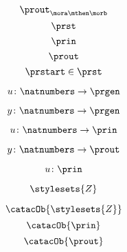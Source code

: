 {\begin{forslides}
        \begin{equation}
            \label{eq:morab-prout}
            \prout_{\mora\mthen\morb}
        \end{equation}
        \begin{equation}
            \label{eq:gen-prst}
            \prst
        \end{equation}
        \begin{equation}
            \label{eq:gen-prin}
            \prin
        \end{equation}
        \begin{equation}
            \label{eq:gen-prout}
            \prout
        \end{equation}
        \begin{equation}
            \label{eq:moore-start}
            \prstart \in \prst
        \end{equation}
        
        \begin{equation}
            \label{eq:prgen-u}
            u\colon \natnumbers \to \prgen
        \end{equation}
        
        \begin{equation}
            \label{eq:prgen-y}
            y\colon \natnumbers \to \prgen
        \end{equation}
        
        
        \begin{equation}
            \label{eq:prgen-u-1}
            u\colon \natnumbers \to \prin
        \end{equation}
        
        \begin{equation}
            \label{eq:prgen-y-1}
            y\colon \natnumbers \to \prout
        \end{equation}
        
        \begin{equation}
            \label{eq:prgen-u-2}
            u\colon \prin
        \end{equation}
        
        
        
        \begin{equation}
            \label{eq:Z}
            \stylesets{Z}
        \end{equation}
        
        
        \begin{equation}
            \label{eq:Za}
            \catacOb{\stylesets{Z}}
        \end{equation}
        \begin{equation}
            \label{eq:Ua}
            \catacOb{\prin}
        \end{equation}
        \begin{equation}
            \label{eq:Ya}
            \catacOb{\prout}
        \end{equation}
        

\end{forslides}}
